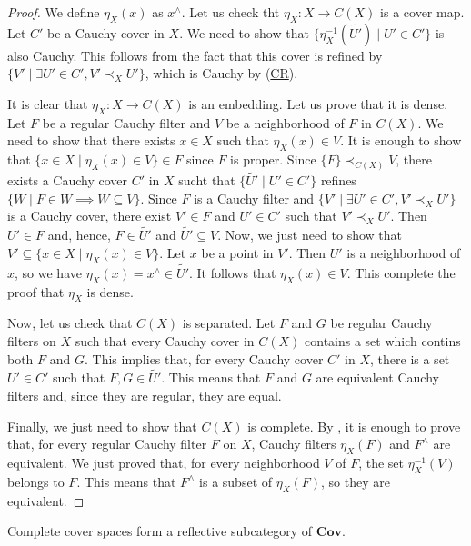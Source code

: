 \documentclass[reqno]{amsart}
\newcommand{\axref}[1]{(\hyperref[ax:#1]{#1})}
\theoremstyle{definition}
\theoremstyle{remark}
\numberwithin{figure}{section}
\newcommand{\rb}{\prec}
\newcommand{\cat}[1]{\mathbf{#1}}
\begin{document}
\begin{proof}
We define $\eta_X(x)$ as $x^\wedge$.
Let us check tht $\eta_X : X \to C(X)$ is a cover map.
Let $C'$ be a Cauchy cover in $X$.
We need to show that $\{ \eta_X^{-1}(\widetilde{U'}) \mid U' \in C' \}$ is also Cauchy.
This follows from the fact that this cover is refined by $\{ V' \mid \exists U' \in C', V' \rb_X U' \}$, which is Cauchy by \axref{CR}.

It is clear that $\eta_X : X \to C(X)$ is an embedding.
Let us prove that it is dense.
Let $F$ be a regular Cauchy filter and $V$ be a neighborhood of $F$ in $C(X)$.
We need to show that there exists $x \in X$ such that $\eta_X(x) \in V$.
It is enough to show that $\{ x \in X \mid \eta_X(x) \in V \} \in F$ since $F$ is proper.
Since $\{ F \} \rb_{C(X)} V$, there exists a Cauchy cover $C'$ in $X$ sucht that $\{ \widetilde{U'} \mid U' \in C' \}$ refines $\{ W \mid F \in W \implies W \subseteq V \}$.
Since $F$ is a Cauchy filter and $\{ V' \mid \exists U' \in C', V' \rb_X U' \}$ is a Cauchy cover, there exist $V' \in F$ and $U' \in C'$ such that $V' \rb_X U'$.
Then $U' \in F$ and, hence, $F \in \widetilde{U'}$ and $\widetilde{U'} \subseteq V$.
Now, we just need to show that $V' \subseteq \{ x \in X \mid \eta_X(x) \in V \}$.
Let $x$ be a point in $V'$.
Then $U'$ is a neighborhood of $x$, so we have $\eta_X(x) = x^\wedge \in \widetilde{U'}$.
It follows that $\eta_X(x) \in V$.
This complete the proof that $\eta_X$ is dense.

Now, let us check that $C(X)$ is separated.
Let $F$ and $G$ be regular Cauchy filters on $X$ such that every Cauchy cover in $C(X)$ contains a set which contins both $F$ and $G$.
This implies that, for every Cauchy cover $C'$ in $X$, there is a set $U' \in C'$ such that $F,G \in \widetilde{U'}$.
This means that $F$ and $G$ are equivalent Cauchy filters and, since they are regular, they are equal.

Finally, we just need to show that $C(X)$ is complete.
By , it is enough to prove that, for every regular Cauchy filter $F$ on $X$, Cauchy filters $\eta_X(F)$ and $F^\wedge$ are equivalent.
We just proved that, for every neighborhood $V$ of $F$, the set $\eta_X^{-1}(V)$ belongs to $F$.
This means that $F^\wedge$ is a subset of $\eta_X(F)$, so they are equivalent.
\end{proof}

\begin{cor}
Complete cover spaces form a reflective subcategory of $\cat{Cov}$.
\end{cor}
\end{document}

